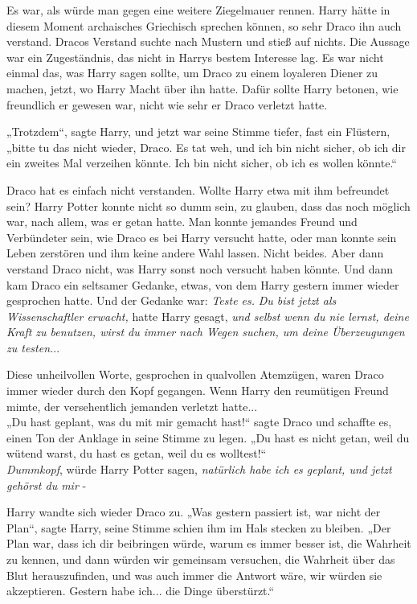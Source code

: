 {Es war, als würde man gegen eine weitere Ziegelmauer rennen. Harry hätte in diesem Moment archaisches Griechisch sprechen können, so sehr Draco ihn auch verstand. Dracos Verstand suchte nach Mustern und stieß auf nichts. Die Aussage war ein Zugeständnis, das nicht in Harrys bestem Interesse lag. Es war nicht einmal das, was Harry sagen sollte, um Draco zu einem loyaleren Diener zu machen, jetzt, wo Harry Macht über ihn hatte. Dafür sollte Harry betonen, wie freundlich er gewesen war, nicht wie sehr er Draco verletzt hatte.

„Trotzdem“, sagte Harry, und jetzt war seine Stimme tiefer, fast ein Flüstern, „bitte tu das nicht wieder, Draco. Es tat weh, und ich bin nicht sicher, ob ich dir ein zweites Mal verzeihen könnte. Ich bin nicht sicher, ob ich es wollen könnte.“

Draco hat es einfach nicht verstanden. Wollte Harry etwa mit ihm befreundet sein? Harry Potter konnte nicht so dumm sein, zu glauben, dass das noch möglich war, nach allem, was er getan hatte. Man konnte jemandes Freund und Verbündeter sein, wie Draco es bei Harry versucht hatte, oder man konnte sein Leben zerstören und ihm keine andere Wahl lassen. Nicht beides. Aber dann verstand Draco nicht, was Harry sonst noch versucht haben könnte. Und dann kam Draco ein seltsamer Gedanke, etwas, von dem Harry gestern immer wieder gesprochen hatte. Und der Gedanke war: \emph{Teste es.} \emph{Du bist jetzt als Wissenschaftler erwacht,} hatte Harry gesagt, \emph{und selbst wenn du nie lernst, deine Kraft zu benutzen, wirst du immer nach Wegen suchen, um deine Überzeugungen zu testen.}..

Diese unheilvollen Worte, gesprochen in qualvollen Atemzügen, waren Draco immer wieder durch den Kopf gegangen. Wenn Harry den reumütigen Freund mimte, der versehentlich jemanden verletzt hatte...\\ „Du hast geplant, was du mit mir gemacht hast!“ sagte Draco und schaffte es, einen Ton der Anklage in seine Stimme zu legen. „Du hast es nicht getan, weil du wütend warst, du hast es getan, weil du es wolltest!“\\ \emph{Dummkopf}, würde Harry Potter sagen, \emph{natürlich habe ich es geplant, und jetzt gehörst du mir} -

Harry wandte sich wieder Draco zu. „Was gestern passiert ist, war nicht der Plan“, sagte Harry, seine Stimme schien ihm im Hals stecken zu bleiben. „Der Plan war, dass ich dir beibringen würde, warum es immer besser ist, die Wahrheit zu kennen, und dann würden wir gemeinsam versuchen, die Wahrheit über das Blut herauszufinden, und was auch immer die Antwort wäre, wir würden sie akzeptieren. Gestern habe ich... die Dinge überstürzt.“

}
